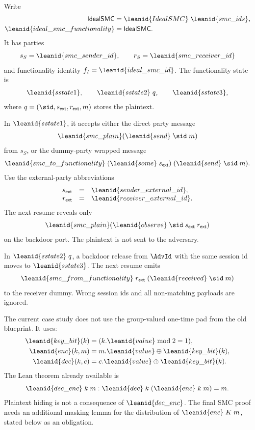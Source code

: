 \begin{definition}
Write
\[
\begin{aligned}
  \IdealSMC &=
    \leanid{IdealSMC}\;\leanid{smc\_ids},\\
  \leanid{ideal\_smc\_functionality} &= \IdealSMC .
\end{aligned}
\]
It has parties
\[
  s_S=\leanid{smc\_sender\_id},\qquad
  r_S=\leanid{smc\_receiver\_id}
\]
and functionality identity \(f_I=\leanid{ideal\_smc\_id}\).  The functionality
state is
\[
  \leanid{sstate1},\qquad
  \leanid{sstate2}\;q,\qquad
  \leanid{sstate3},
\]
where \(q=(\sid,s_{\mathsf{ext}},r_{\mathsf{ext}},m)\) stores the plaintext.

In \(\leanid{sstate1}\), it accepts either the direct party message
\[
  \leanid{smc\_plain}(\leanid{send}\;\sid\;m)
\]
from \(s_S\), or the dummy-party wrapped message
\[
  \leanid{smc\_to\_functionality}
    \;(\leanid{some}\;s_{\mathsf{ext}})
    \;(\leanid{send}\;\sid\;m).
\]
Use the external-party abbreviations
\[
\begin{array}{rcl}
s_{\mathsf{ext}}&=&\leanid{sender\_external\_id},\\
r_{\mathsf{ext}}&=&\leanid{receiver\_external\_id}.
\end{array}
\]
The next resume reveals only
\[
  \leanid{smc\_plain}
    (\leanid{observe}\;\sid\;s_{\mathsf{ext}}\;r_{\mathsf{ext}})
\]
on the backdoor port.  The plaintext is not sent to the adversary.

In \(\leanid{sstate2}\;q\), a backdoor release from \(\AdvId\) with the same
session id moves to \(\leanid{sstate3}\).  The next resume emits
\[
  \leanid{smc\_from\_functionality}\;r_{\mathsf{ext}}\;
    (\leanid{received}\;\sid\;m)
\]
to the receiver dummy.  Wrong session ids and all non-matching payloads are
ignored.
\end{definition}

\begin{definition}
The current case study does not use the group-valued one-time pad from the old
blueprint.  It uses:
\[
\begin{aligned}
\leanid{key\_bit}(k) &=(k.\leanid{value}\bmod 2=1),\\
\leanid{enc}(k,m) &= m.\leanid{value}\oplus \leanid{key\_bit}(k),\\
\leanid{dec}(k,c) &= c.\leanid{value}\oplus \leanid{key\_bit}(k).
\end{aligned}
\]
The Lean theorem already available is
\[
  \leanid{dec\_enc}\;k\;m :
  \leanid{dec}\;k\;(\leanid{enc}\;k\;m)=m.
\]
Plaintext hiding is not a consequence of \(\leanid{dec\_enc}\).  The final SMC
proof needs an additional masking lemma for the distribution of
\(\leanid{enc}\;K\;m\), stated below as an obligation.
\end{definition}

